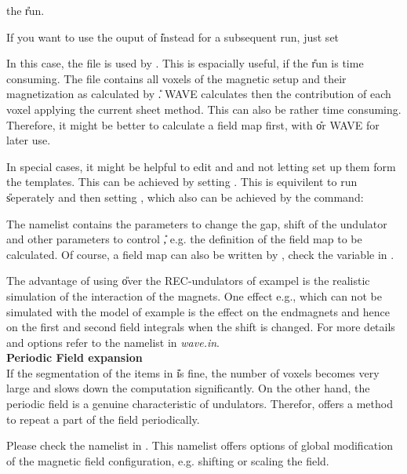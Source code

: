 
the \U run.

If you want to use the ouput
of \U instead for a subsequent \W run, just set


In this case, the file  is used by \W. This is
espacially useful, if the \U run is time consuming. The file
 contains all voxels of the magnetic setup and
their magnetization as calculated by \U.
WAVE calculates then the contribution of each
voxel applying the current sheet method. This can also be rather time
consuming. Therefore, it might be better to calculate a field map
first, with \U or WAVE for later use.

In special cases, it might be helpful to edit  and
 and not letting \W set up them form the templates.
This can be achieved by setting . This is equivilent to
run \U seperately and then setting , which
also can be achieved by the command:


The namelist  contains the parameters to change the
gap, shift of the undulator and other parameters to control
\U, e.g. the definition of the field map to be calculated.
Of course, a field map can also be written by \W, check the variable
 in \wie.

The advantage of using \U over the REC-undulators of
exampel  is the realistic simulation of the interaction of the
magnets. One effect e.g., which can not be simulated with the model of
example  is the effect on the endmagnets and hence on the first and
second field integrals when the shift is changed. For more details and
options refer to the namelist  in  {\it wave.in}.\\[0.5cm]

{\bf Periodic Field expansion\\[0.5cm]
}
If the segmentation of the items in \U is fine, the number of voxels
becomes very large and slows down the computation significantly. On
the other hand, the periodic field is a genuine characteristic of
undulators. Therefor, \W offers a method to repeat a part of the
field periodically.

Please check the namelist
 in \wie. This namelist offers options of global modification
of the magnetic field configuration, e.g. shifting or scaling the field.

